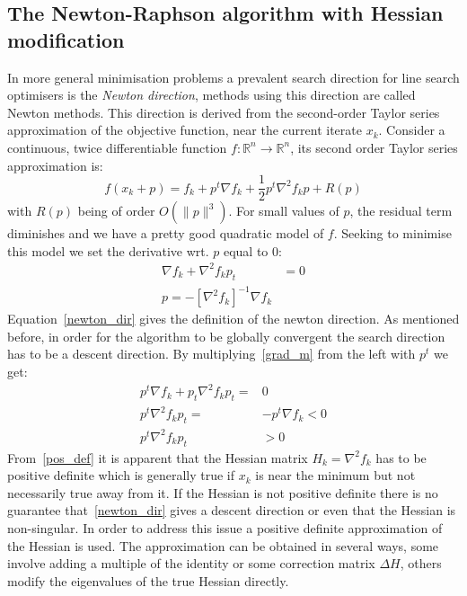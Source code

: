 \documentclass[11pt]{article}
\begin{document}
    \subsection{The Newton-Raphson algorithm with Hessian modification}
    \label{newtonalgo}
    In more general minimisation problems a prevalent search direction for line search optimisers is the \textit{Newton direction}, methods using this direction are called Newton methods.
    This direction is derived from the second-order Taylor series approximation of the objective function, near the current iterate $x_k$.
    Consider a continuous, twice differentiable function $f: \mathbb{R}^n \to \mathbb{R}^n$, its second order Taylor series approximation is:
    \begin{equation}
        f(x_k + p) = f_k + p^t \nabla f_k + \frac{1}{2} p^t \nabla^2 f_k p + R(p) \label{taylor}
    \end{equation}
    with $R(p)$ being of order $O(\rVert p \rVert^3)$.
    For small values of $p$, the residual term diminishes and we have a pretty good quadratic model of $f$.
    Seeking to minimise this model we set the derivative wrt. $p$ equal to 0:
    \begin{align}
        \nabla f_k + \nabla^2 f_k p_t &= 0  \label{grad_m} \\
        p = -\left[ \nabla^2 f_k \right]^{-1} \nabla f_k \label{newton_dir}
    \end{align}
    Equation~\eqref{newton_dir} gives the definition of the newton direction.
    As mentioned before, in order for the algorithm to be globally convergent the search direction has to be a descent direction.
    By multiplying~\eqref{grad_m} from the left with $p^t$ we get:
    \begin{align}
        p^t \nabla f_k + p_t \nabla^2 f_k p_t =& 0 \\
        p^t \nabla^2 f_k p_t =& -p^t \nabla f_k < 0 \\
        p^t \nabla^2 f_k p_t &> 0 \label{pos_def}
    \end{align}
    From~\eqref{pos_def} it is apparent that the Hessian matrix $H_k=\nabla^2 f_k$ has to be positive definite which is generally true if $x_k$ is near the minimum but not necessarily true away from it.
    If the Hessian is not positive definite there is no guarantee that~\eqref{newton_dir} gives a descent direction or even that the Hessian is non-singular.
    In order to address this issue a positive definite approximation of the Hessian is used.
    The approximation can be obtained in several ways, some involve adding a multiple of the identity or some correction matrix $\Delta H$, others modify the eigenvalues of the true Hessian directly.
\end{document}
